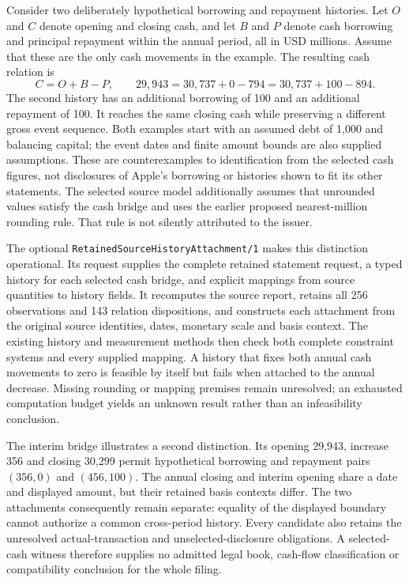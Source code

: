 Consider two deliberately hypothetical borrowing and repayment histories.
Let \(O\) and \(C\) denote opening and closing cash, and let \(B\) and \(P\)
denote cash borrowing and principal repayment within the annual period, all
in USD millions. Assume that these are the only cash movements in the example.
The resulting cash relation is
\[
  C=O+B-P,\qquad
  29{,}943=30{,}737+0-794
           =30{,}737+100-894.
\]
The second history has an additional borrowing of 100 and an additional
repayment of 100. It reaches the same closing cash while preserving a different
gross event sequence. Both examples start with an assumed debt of 1,000 and
balancing capital; the event dates and finite amount bounds are also supplied
assumptions. These are counterexamples to identification from the selected
cash figures, not disclosures of Apple's borrowing or histories shown to fit
its other statements. The selected source model additionally assumes that
unrounded values satisfy the cash bridge and uses the earlier proposed
nearest-million rounding rule. That rule is not silently attributed to the issuer.

The optional \texttt{RetainedSourceHistoryAttachment/1} makes this distinction
operational. Its request supplies the complete retained statement request,
a typed history for each selected cash bridge, and explicit mappings from
source quantities to history fields. It recomputes the source report, retains
all 256 observations and 143 relation dispositions, and constructs each
attachment from the original source identities, dates, monetary scale and
basis context. The existing history and measurement methods then check both
complete constraint systems and every supplied mapping. A history that fixes
both annual cash movements to zero is feasible by itself but fails when
attached to the annual decrease. Missing rounding or mapping premises remain
unresolved; an exhausted computation budget yields an unknown result rather
than an infeasibility conclusion.

The interim bridge illustrates a second distinction. Its opening 29,943,
increase 356 and closing 30,299 permit hypothetical borrowing and repayment
pairs \((356,0)\) and \((456,100)\). The annual closing and interim opening
share a date and displayed amount, but their retained basis contexts differ.
The two attachments consequently remain separate: equality of the displayed
boundary cannot authorize a common cross-period history. Every candidate also
retains the unresolved actual-transaction and unselected-disclosure obligations.
A selected-cash witness therefore supplies no admitted legal book, cash-flow
classification or compatibility conclusion for the whole filing.

